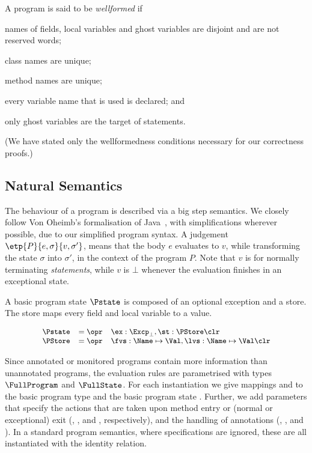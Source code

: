 A program is said to be \emph{wellformed} if
\begin{inparaenum}
\item names of fields, local variables and ghost variables are
disjoint and are not reserved words;
\item class names are unique;
\item method names are unique;
\item every variable name that is used is declared; and
\item only ghost variables are the target of \Set statements.
\end{inparaenum}
(We have stated only the wellformedness conditions necessary for our
correctness proofs.)

\subsection{Natural Semantics}\label{SecSemantics}
The behaviour of a program is described via a big step semantics. We
closely follow Von Oheimb's formalisation of Java~\cite{Oheimb01},
with simplifications wherever possible, due to our simplified
program syntax. A judgement $\etp{P}{e,\sigma}{v,\sigma'}$, means that the body
$e$ evaluates to $v$, while transforming the state $\sigma$ into $\sigma'$, in
the context of the program \(P\). Note that \(v\) is \One for
normally terminating \emph{statements}, while \(v\) is \(\bot\) whenever
the evaluation finishes in an exceptional state.

A basic program state \(\Pstate\) is composed of an optional exception
and a store.  The store maps every field and local variable to a
value.

\[
{\small
\begin{array}{rcl}
\Pstate & = \opr & \ex : \Excp_{\bot}, \st : \PStore \clr\\
\PStore & = \opr & \fvs : \Name \mapsto \Val, \lvs : \Name \mapsto \Val \clr
\end{array}}
\]


Since annotated or monitored programs
contain more information than unannotated programs, the
evaluation rules are parametrised with types
\(\FullProgram\) and \(\FullState\). For each instantiation we give
mappings \program and \progstate to the basic program type \Program
and the basic program state \Pstate. Further, we add parameters that
specify the actions that are taken upon method entry or (normal or
exceptional) exit (\gammain, \gammanorm, and \gammaexc, respectively),
and the handling of annotations (\deltaset, \deltaassert, and
\deltacase).  In a standard program semantics, where specifications
are ignored, these are all instantiated with the identity relation.

